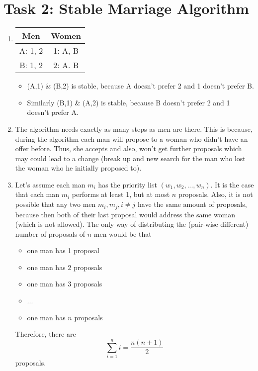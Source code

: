 \documentclass{scrartcl}
\begin{document}
	\section*{Task 2: Stable Marriage Algorithm}
	\begin{enumerate}
		\item\phantom{phantom}
		\begin{center}
			\begin{tabular}{c|c}
				Men & Women\\
				\hline
				A: 1, 2 & 1: A, B\\
				B: 1, 2 & 2: A. B
			\end{tabular}
		\end{center}
		\begin{itemize}
			\item (A,1) \& (B,2) is stable, because A doesn't prefer 2 and 1 doesn't prefer B.
			\item Similarly (B,1) \& (A,2) is stable, because B doesn't prefer 2 and 1 doesn't prefer A.
		\end{itemize}
		
		\item The algorithm needs exactly as many steps as men are there.
		This is because, during the algorithm each man will propose to a woman who didn't have an offer before.
		Thus, she accepts and also, won't get further proposals which may could lead to a change (break up and new search for the man who lost the woman who he initially proposed to).
		
		\item Let's assume each man $m_i$ has the priority list $(w_1, w_2, ..., w_n)$.
		It is the case that each man $m_i$ performs at least 1, but at most $n$ proposals.
		Also, it is not possible that any two men $m_i, m_j, i\neq j$ have the same amount of proposals, because then both of their last proposal would address the same woman (which is not allowed).
		The only way of distributing the (pair-wise different) number of proposals of $n$ men would be that
		\begin{itemize}
			\item one man has 1 proposal
			\item one man has 2 proposals
			\item one man has 3 proposals
			\item ...
			\item one man has $n$ proposals
		\end{itemize}
		Therefore, there are
		\[\sum_{i=1}^ni=\frac{n(n+1)}{2}\]
		proposals.
		

\end{enumerate}
\end{document}
